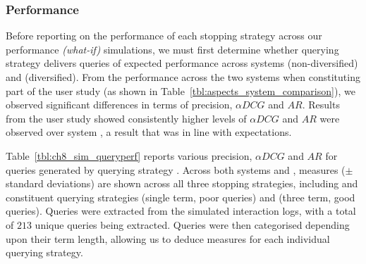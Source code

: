 \subsubsection{Performance}\label{sec:diversity:simulated:results:perf}
\vspace*{-3mm}
Before reporting on the performance of each stopping strategy across our performance \emph{(what-if)} simulations, we must first determine whether querying strategy  delivers queries of expected performance across systems  (non-diversified) and  (diversified). From the performance across the two systems when constituting part of the user study (as shown in Table~\ref{tbl:aspects_system_comparison}), we observed significant differences in terms of precision, $\alpha DCG$ and $AR$. Results from the user study showed consistently higher levels of $\alpha DCG$ and $AR$ were observed over system , a result that was in line with expectations.

Table~\ref{tbl:ch8_sim_queryperf} reports various precision, $\alpha DCG$ and $AR$ for queries generated by querying strategy . Across both systems  and , measures ($\pm$ standard deviations) are shown across all three stopping strategies, including  and constituent querying strategies  (single term, poor queries) and  (three term, good queries). Queries were extracted from the simulated interaction logs, with a total of $213$ unique queries being extracted. Queries were then categorised depending upon their term length, allowing us to deduce measures for each individual querying strategy.

